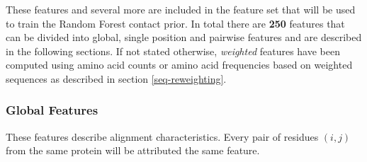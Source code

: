 \documentclass[12pt,a4paper,twoside]{book}
\theoremstyle{definition}
\theoremstyle{definition}
\theoremstyle{remark}
\begin{document}
These features and several more are included in the feature set that
will be used to train the Random Forest contact prior. In total there
are \textbf{250} features that can be divided into global, single
position and pairwise features and are described in the following
sections. If not stated otherwise, \emph{weighted} features have been
computed using amino acid counts or amino acid frequencies based on
weighted sequences as described in section \ref{seq-reweighting}.

\subsubsection{Global Features}\label{seq-features-global}

These features describe alignment characteristics. Every pair of
residues \((i,j)\) from the same protein will be attributed the same
feature.
\end{document}

